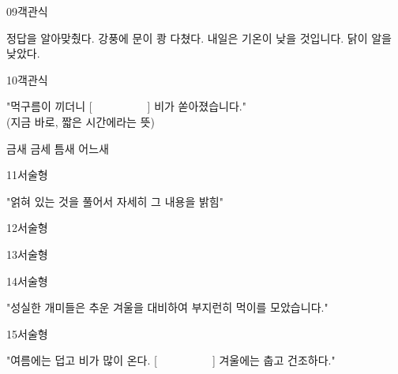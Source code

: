 \documentclass[fs11,seriesFre]{korfarm-base}
\begin{document}
\begin{kfQBlock}{09}{객관식}
\begin{kfChoices}
\kfChoice 정답을 알아맞췄다.
\kfChoice 강풍에 문이 쾅 다쳤다.
\kfChoice 내일은 기온이 낮을 것입니다.
\kfChoice 닭이 알을 낮았다.
\end{kfChoices}
\end{kfQBlock}

\begin{kfQBlock}{10}{객관식}
\begin{kfEvidence}"먹구름이 끼더니 [　　　　　] 비가 쏟아졌습니다." \\\relax
(지금 바로, 짧은 시간에라는 뜻)\end{kfEvidence}
\begin{kfChoices}
\kfChoice 금새
\kfChoice 금세
\kfChoice 틈새
\kfChoice 어느새
\end{kfChoices}
\end{kfQBlock}

\begin{kfQBlock}{11}{서술형}
\begin{kfEvidence}"얽혀 있는 것을 풀어서 자세히 그 내용을 밝힘"\end{kfEvidence}
\end{kfQBlock}

\begin{kfQBlock}{12}{서술형}
\end{kfQBlock}

\begin{kfQBlock}{13}{서술형}
\end{kfQBlock}

\begin{kfQBlock}{14}{서술형}
\begin{kfEvidence}"성실한 개미들은 추운 겨울을 대비하여 부지런히 먹이를 모았습니다."\end{kfEvidence}
\end{kfQBlock}

\begin{kfQBlock}{15}{서술형}
\begin{kfEvidence}"여름에는 덥고 비가 많이 온다. [　　　　　] 겨울에는 춥고 건조하다."\end{kfEvidence}
\end{kfQBlock}
\end{document}
